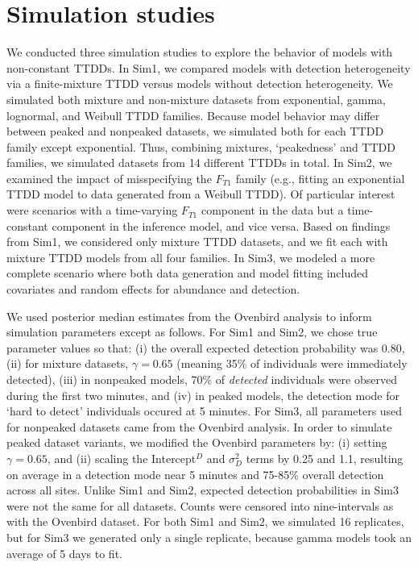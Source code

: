 \documentclass[useAMS,usenatbib,referee,12pt]{article}
\begin{document}
\section{Simulation studies}

We conducted three simulation studies to explore the behavior of models with non-constant TTDDs.
In Sim1, we compared models with detection heterogeneity via a finite-mixture TTDD versus models without detection heterogeneity.
We simulated both mixture and non-mixture datasets from exponential, gamma, lognormal, and Weibull TTDD families.  
Because model behavior may differ between peaked and nonpeaked datasets, we simulated both for each TTDD family except exponential.  
Thus, combining mixtures, `peakedness' and TTDD families, we simulated datasets from 14 different TTDDs in total.  
In Sim2, we examined the impact of misspecifying the $F_{T1}$ family (e.g., fitting an exponential TTDD model to data generated from a Weibull TTDD).  
Of particular interest were scenarios with a time-varying $F_{T1}$ component in the data but a time-constant component in the inference model, and vice versa.
Based on findings from Sim1, we considered only mixture TTDD datasets, and we fit each with mixture TTDD models from all four families.  
In Sim3, we modeled a more complete scenario where both data generation and model fitting included covariates and random effects for abundance and detection.  

We used posterior median estimates from the Ovenbird analysis to inform simulation parameters except as follows.  
For Sim1 and Sim2, we chose true parameter values so that: (i) the overall expected detection probability was 0.80, (ii) for mixture datasets, $\gamma = 0.65$ (meaning 35\% of individuals were immediately detected), (iii) in nonpeaked models, 70\% of \textit{detected} individuals were observed during the first two minutes, and (iv) in peaked models, the detection mode for `hard to detect' individuals occured at 5 minutes.  
For Sim3, all parameters used for nonpeaked datasets came from the Ovenbird analysis.
In order to simulate peaked dataset variants, we modified the Ovenbird parameters by:  (i) setting $\gamma = 0.65$, and (ii) scaling the Intercept$^D$ and $\sigma_D^2$ terms by 0.25 and 1.1, resulting on average in a detection mode near 5 minutes and 75-85\% overall detection across all sites.  
Unlike Sim1 and Sim2, expected detection probabilities in Sim3 were not the same for all datasets.
Counts were censored into nine-intervals as with the Ovenbird dataset.  
For both Sim1 and Sim2, we simulated 16 replicates, but for Sim3 we generated only a single replicate, because gamma models took an average of 5 days to fit.
\end{document}

